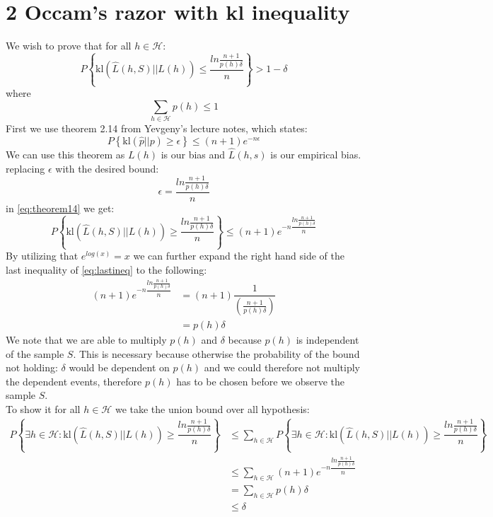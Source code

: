 \documentclass{article}
\begin{document}
\section{2 Occam’s razor with kl inequality}
We wish to prove that for all $h \in \mathcal{H}$:
\begin{equation}
\label{eq:proove}
P \left\lbrace \text{kl}(\hat{L}(h,S) || L(h)) \leq \dfrac{ln  \frac{n+1}{p(h) \delta} }{n} \right\rbrace > 1 - \delta
\end{equation}
where
$$
\sum\limits_{h \in \mathcal{H}} p(h) \leq 1
$$
First we use theorem 2.14 from Yevgeny's lecture notes, which states:
\begin{equation}
\label{eq:theorem14}
P\left\lbrace \text{kl}(\hat{p} || p) \geq \epsilon \right\rbrace \leq (n+1)e^{-n\epsilon}
\end{equation}
We can use this theorem as $L(h)$ is our bias and $\hat{L}(h,s)$ is our empirical bias.\\
replacing $\epsilon$ with the desired bound:
$$
\epsilon = \dfrac{ln  \frac{n+1}{p(h) \delta} }{n}
$$
in \eqref{eq:theorem14} we get:
\begin{equation}
\label{eq:lastineq}
P\left\lbrace \text{kl}(\hat{L}(h,S) || L(h)) \geq \dfrac{ln  \frac{n+1}{p(h) \delta} }{n} \right\rbrace \leq (n+1)e^{-n\dfrac{ln  \frac{n+1}{p(h) \delta} }{n}}
\end{equation}
By utilizing that $e^{log(x)} = x$ we can further expand the right hand side of the last inequality of \eqref{eq:lastineq} to the following:
\begin{align*}
(n+1)e^{-n\dfrac{ln  \frac{n+1}{p(h) \delta} }{n}}
&= (n+1)\dfrac{1}{\left(\frac{n+1}{p(h) \delta}\right)} \\
&=  p(h) \delta
\end{align*}
We note that we are able to multiply $p(h)$ and $\delta$ because $p(h)$ is independent of the sample $S$. This is necessary because otherwise the probability of the bound not holding: $\delta$ would be dependent on $p(h)$ and we could therefore not multiply the dependent events, therefore $p(h)$ has to be chosen before we observe the sample $S$. \\
To show it for all $h \in \mathcal{H}$ we take the union bound over all hypothesis:
\begin{align*}
P\left\lbrace \exists h \in \mathcal{H} : \text{kl}(\hat{L}(h,S) || L(h)) \geq \dfrac{ln  \frac{n+1}{p(h) \delta} }{n} \right\rbrace
&\leq \sum\limits_{h \in \mathcal{H}} P\left\lbrace \exists h \in \mathcal{H} : \text{kl}(\hat{L}(h,S) || L(h)) \geq \dfrac{ln  \frac{n+1}{p(h) \delta} }{n} \right\rbrace \\
&\leq \sum\limits_{h \in \mathcal{H}} (n+1)e^{-n\dfrac{ln  \frac{n+1}{p(h) \delta} }{n}} \\
&= \sum\limits_{h \in \mathcal{H}} p(h) \delta \\
&\leq \delta
\end{align*}
\end{document}
